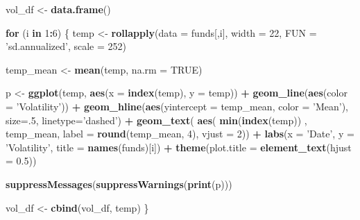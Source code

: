 \documentclass[]{article}
\newenvironment{Shaded}{\begin{snugshade}}{\end{snugshade}}
\newcommand{\ControlFlowTok}[1]{\textcolor[rgb]{0.13,0.29,0.53}{\textbf{#1}}}
\newcommand{\DataTypeTok}[1]{\textcolor[rgb]{0.13,0.29,0.53}{#1}}
\newcommand{\DecValTok}[1]{\textcolor[rgb]{0.00,0.00,0.81}{#1}}
\newcommand{\FloatTok}[1]{\textcolor[rgb]{0.00,0.00,0.81}{#1}}
\newcommand{\KeywordTok}[1]{\textcolor[rgb]{0.13,0.29,0.53}{\textbf{#1}}}
\newcommand{\NormalTok}[1]{#1}
\newcommand{\OperatorTok}[1]{\textcolor[rgb]{0.81,0.36,0.00}{\textbf{#1}}}
\newcommand{\OtherTok}[1]{\textcolor[rgb]{0.56,0.35,0.01}{#1}}
\newcommand{\StringTok}[1]{\textcolor[rgb]{0.31,0.60,0.02}{#1}}
\begin{document}
\begin{Shaded}
\begin{Highlighting}[]
\NormalTok{vol_df <-}\StringTok{ }\KeywordTok{data.frame}\NormalTok{()}
  
\ControlFlowTok{for}\NormalTok{ (i }\ControlFlowTok{in} \DecValTok{1}\OperatorTok{:}\DecValTok{6}\NormalTok{) \{}
\NormalTok{  temp <-}\StringTok{ }\KeywordTok{rollapply}\NormalTok{(}\DataTypeTok{data =}\NormalTok{ funds[,i], }\DataTypeTok{width =} \DecValTok{22}\NormalTok{, }\DataTypeTok{FUN =} \StringTok{'sd.annualized'}\NormalTok{, }\DataTypeTok{scale =} \DecValTok{252}\NormalTok{)}
  
\NormalTok{  temp_mean <-}\StringTok{ }\KeywordTok{mean}\NormalTok{(temp, }\DataTypeTok{na.rm =} \OtherTok{TRUE}\NormalTok{)}
  
\NormalTok{  p <-}\StringTok{ }\KeywordTok{ggplot}\NormalTok{(temp, }\KeywordTok{aes}\NormalTok{(}\DataTypeTok{x =} \KeywordTok{index}\NormalTok{(temp), }\DataTypeTok{y =}\NormalTok{ temp)) }\OperatorTok{+}\StringTok{ }
\StringTok{  }\KeywordTok{geom_line}\NormalTok{(}\KeywordTok{aes}\NormalTok{(}\DataTypeTok{color =} \StringTok{'Volatility'}\NormalTok{)) }\OperatorTok{+}
\StringTok{  }\KeywordTok{geom_hline}\NormalTok{(}\KeywordTok{aes}\NormalTok{(}\DataTypeTok{yintercept =}\NormalTok{ temp_mean, }\DataTypeTok{color =} \StringTok{'Mean'}\NormalTok{),}
             \DataTypeTok{size=}\NormalTok{.}\DecValTok{5}\NormalTok{, }\DataTypeTok{linetype=}\StringTok{'dashed'}\NormalTok{) }\OperatorTok{+}
\StringTok{  }\KeywordTok{geom_text}\NormalTok{( }\KeywordTok{aes}\NormalTok{( }\KeywordTok{min}\NormalTok{(}\KeywordTok{index}\NormalTok{(temp)) , temp_mean, }\DataTypeTok{label =} \KeywordTok{round}\NormalTok{(temp_mean, }\DecValTok{4}\NormalTok{), }\DataTypeTok{vjust =} \DecValTok{2}\NormalTok{)) }\OperatorTok{+}
\StringTok{  }\KeywordTok{labs}\NormalTok{(}\DataTypeTok{x =} \StringTok{'Date'}\NormalTok{, }\DataTypeTok{y =} \StringTok{'Volatility'}\NormalTok{, }\DataTypeTok{title =} \KeywordTok{names}\NormalTok{(funds)[i]) }\OperatorTok{+}
\StringTok{  }\KeywordTok{theme}\NormalTok{(}\DataTypeTok{plot.title =} \KeywordTok{element_text}\NormalTok{(}\DataTypeTok{hjust =} \FloatTok{0.5}\NormalTok{))}
  
  \KeywordTok{suppressMessages}\NormalTok{(}\KeywordTok{suppressWarnings}\NormalTok{(}\KeywordTok{print}\NormalTok{(p)))}
  
\NormalTok{  vol_df <-}\StringTok{ }\KeywordTok{cbind}\NormalTok{(vol_df, temp)}
\NormalTok{\}}
\end{Highlighting}
\end{Shaded}
\end{document}
